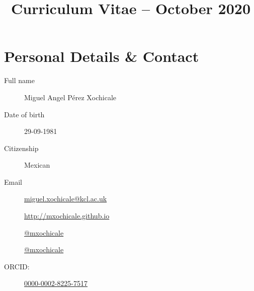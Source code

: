 \documentclass[10pt,a4paper,roman]{moderncv}
\title{Curriculum Vitae -- October 2020}
\begin{document}
%
%
\makecvtitle



%


\vspace{-15mm}


\section{Personal Details \& Contact}
%

\begin{changemargin}{10mm}{50mm}
  \begin{minipage}{.4\textwidth}
    \begin{description}
	\item[Full name] Miguel Angel P\'erez Xochicale
     	\item[Date of birth] 29-09-1981
	\item[Citizenship] Mexican 
	\item[Email]  
		\href{miguel.xochicale@kcl.ac.uk}
			{miguel.xochicale@kcl.ac.uk}

     \end{description}
  \end{minipage}
  \begin{minipage}{.4\textwidth}
  \begin{description}
     	\item[\faHome]  \href{http://mxochicale.github.io}{http://mxochicale.github.io}
	\item[\faTwitter ] \href{https://twitter.com/_mxochicale}{@\textunderscore mxochicale}
	\item[\faGithub]  \href{https://github.com/mxochicale}{@mxochicale}
	\item[ORCID:] \href{http://orcid.org/0000-0002-8225-7517}{0000-0002-8225-7517}
   \end{description}
  \end{minipage}
\end{changemargin}
\end{document}

